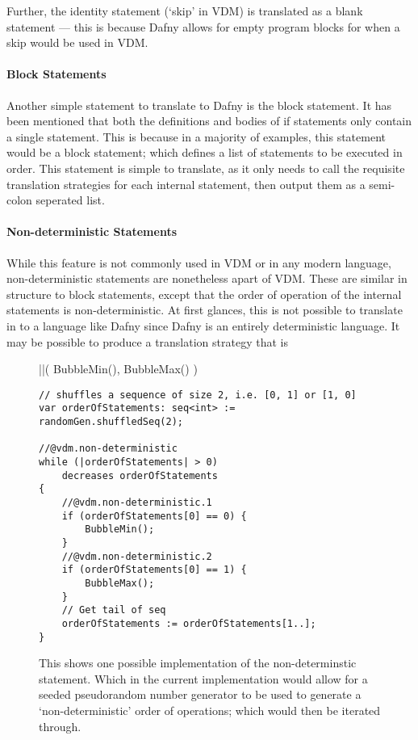 \documentclass{entcs}
\begin{document}
Further, the identity statement (`skip' in VDM) is translated as a blank statement --- this is because Dafny allows for empty program blocks for when a skip would be used in VDM. 

\paragraph{Block Statements}

Another simple statement to translate to Dafny is the block statement. It has been mentioned that both the definitions and bodies of if statements only contain a single statement. This is because in a majority of examples, this statement would be a block statement; which defines a list of statements to be executed in order. This statement is simple to translate, as it only needs to call the requisite translation strategies for each internal statement, then output them as a semi-colon seperated list.

\paragraph{Non-deterministic Statements}

While this feature is not commonly used in VDM or in any modern language, non-deterministic statements are nonetheless apart of VDM. These are similar in structure to block statements, except that the order of operation of the internal statements is non-deterministic. At first glances, this is not possible to translate in to a language like Dafny since Dafny is an entirely deterministic language. It may be possible to produce a translation strategy that is 


\begin{figure}[h]
	\begin{center}
        \begin{vdmsl}
||(
    BubbleMin(),
    BubbleMax()
)
        \end{vdmsl}
        \begin{lstlisting}[language=Dafny]
// shuffles a sequence of size 2, i.e. [0, 1] or [1, 0]
var orderOfStatements: seq<int> := randomGen.shuffledSeq(2);

//@vdm.non-deterministic
while (|orderOfStatements| > 0) 
    decreases orderOfStatements
{
    //@vdm.non-deterministic.1
    if (orderOfStatements[0] == 0) {
        BubbleMin();
    }
    //@vdm.non-deterministic.2
    if (orderOfStatements[0] == 1) {
        BubbleMax();
    }
    // Get tail of seq 
    orderOfStatements := orderOfStatements[1..];
}
        \end{lstlisting}
		\caption{This shows one possible implementation of the non-determinstic statement. Which in the current implementation would allow for a seeded pseudorandom number generator to be used to generate a `non-deterministic' order of operations; which would then be iterated through.}\label{fig:non-determinism}
	\end{center}
\end{figure}
        
\end{document}
